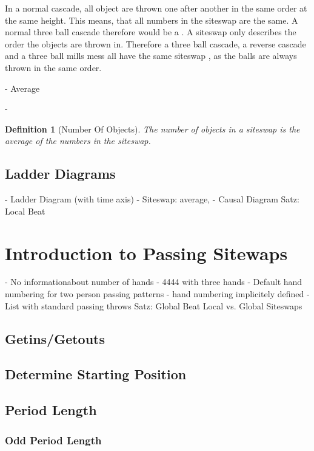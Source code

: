 \documentclass[a4paper,12pt,parskip=full]{scrreprt}
\newtheorem{definition}{Definition}
\begin{document}
	In a normal cascade, all object are thrown one after another in the same order at the same height. This means, that all numbers in the siteswap are the same. A normal three ball cascade therefore would be a . A siteswap only describes the order the objects are thrown in. Therefore a three ball cascade, a reverse cascade and a three ball mills mess all have the same siteswap , as the balls are always thrown in the same order.
	
	- Average
	
	- 

	\begin{definition}[Number Of Objects]
	The number of objects in a siteswap is the average of the numbers in the siteswap.
	\end{definition}



	\section{Ladder Diagrams}
	
	- Ladder Diagram (with time axis)
	- Siteswap: average, 
	- Causal Diagram
	Satz: Local Beat
	\chapter{Introduction to Passing Sitewaps}
	- No informationabout number of hands
	- 4444 with three hands
	- Default hand numbering for two person passing patterns
	- hand numbering implicitely defined
	- List with standard passing throws
	Satz: Global Beat
	Local vs. Global Siteswaps
	\section{Getins/Getouts}
	\section{Determine Starting Position}
	\section{Period Length}
	\subsection{Odd Period Length}
\end{document}
